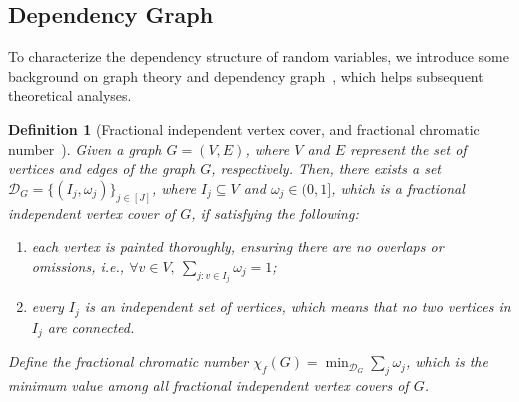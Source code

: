 \documentclass{article}
\newtheorem{definition}{Definition}
\begin{document}
\subsection{Dependency Graph}
\label{sec:dependency_graph}
To characterize the dependency structure of random variables, we introduce some background on graph theory and dependency graph~\cite{jason04}, which helps subsequent theoretical analyses.
    \begin{definition}[Fractional independent vertex cover, and fractional chromatic number~\cite{zhang2022generalization}]
    \label{def:fractional vertex cover appendix}
        Given a graph $G = (V,E)$, where $V$ and $E$ represent the set of vertices and edges of the graph $G$, respectively. Then, there exists a set $\mathcal{D}_{G} = \{ (I_j, \omega_j) \}_{j \in [J]}$, where $I_j \subseteq V$ and $\omega_j \in (0,1]$, which is a fractional independent vertex cover of $G$, if satisfying the following: 
        \begin{enumerate}[(1)]
        \setlength\itemsep{-0.2pt}
        \vspace{-0.1in}
            \item each vertex is painted thoroughly, ensuring there are no overlaps or omissions, i.e., $\forall v \in V, \ \sum_{j: v \in I_j} \omega_j = 1$;
            \item every \( I_j \) is an independent set of vertices, which means that no two vertices in \( I_j \) are connected.
        \end{enumerate}
        \vspace{-0.1in}
        Define the fractional chromatic number $\chi_{f}(G) = \min_{\mathcal{D}_{G}} \sum_j \omega_j$, which is the minimum value among all fractional independent vertex covers of $G$.
    \end{definition}
\end{document}

